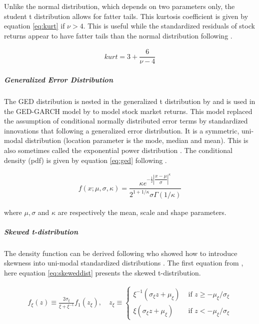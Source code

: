 \documentclass[a4paper, twoside]{templates/ociamthesis}
\begin{document}
\noindent Unlike the normal distribution, which depends on two parameters only, the student t distribution allows for fatter tails. This kurtosis coefficient is given by equation \eqref{eq:kurt} if \(\nu>4\). This is useful while the standardized residuals of stock returns appear to have fatter tails than the normal distribution following \textcite{bollerslev2008}.

\begin{align}
kurt = 3 + \dfrac{6}{\nu-4}
 \label{eq:kurt}
\end{align}

\hypertarget{generalized-error-distribution}{%
\subparagraph{Generalized Error Distribution}\label{generalized-error-distribution}}

\noindent The GED distribution is nested in the generalized t distribution by \textcite{mcdonald1988} and is used in the GED-GARCH model by \textcite{nelson1991} to model stock market returns. This model replaced the assumption of conditional normally distributed error terms by standardized innovations that following a generalized error distribution. It is a symmetric, uni-modal distribution (location parameter is the mode, median and mean). This is also sometimes called the exponential power distribution \autocite{bollerslev2008}. The conditional density (pdf) is given by equation \eqref{eq:ged} following \textcite{ghalanos2020}.

\begin{align}
f(x; \mu, \sigma, \kappa) = \dfrac{\kappa e^{-\frac{1}{2}\left|\dfrac{x-\mu}{\sigma}\right|^\kappa}}{2^{1+1/\kappa}\sigma\Gamma(1/\kappa)}
 \label{eq:ged}
\end{align}

where \(\mu, \sigma\) and \(\kappa\) are respectively the mean, scale and shape parameters.

\hypertarget{skewed-t-distribution}{%
\subparagraph{Skewed t-distribution}\label{skewed-t-distribution}}

\noindent The density function can be derived following \textcite{fernández1998} who showed how to introduce skewness into uni-modal standardized distributions \autocite{trottier2015}. The first equation from \textcite{trottier2015}, here equation \eqref{eq:skeweddist} presents the skewed t-distribution.

\begin{align}
f_{\xi}(z) \equiv \frac{2 \sigma_{\xi}}{\xi+\xi^{-1}} f_{1}\left(z_{\xi}\right), \quad z_{\xi} \equiv\left\{\begin{array}{ll}
\xi^{-1}\left(\sigma_{\xi} z+\mu_{\xi}\right) & \text { if } z \geq-\mu_{\xi} / \sigma_{\xi} \\
\xi\left(\sigma_{\xi} z+\mu_{\xi}\right) & \text { if } z<-\mu_{\xi} / \sigma_{\xi}
\end{array}\right.
 \label{eq:skeweddist}
\end{align}
\end{document}

